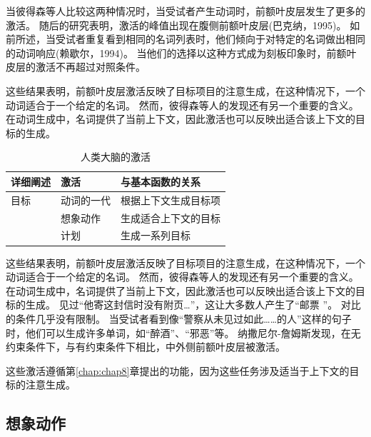 当彼得森等人比较这两种情况时，当受试者产生动词时，前额叶皮层发生了更多的激活。
随后的研究表明，激活的峰值出现在腹侧前额叶皮层(巴克纳，1995)。
如前所述，当受试者重复看到相同的名词列表时，他们倾向于对特定的名词做出相同的动词响应(赖歇尔，1994)。
当他们的选择以这种方式成为刻板印象时，前额叶皮层的激活不再超过对照条件。
\par


这些结果表明，前额叶皮层激活反映了目标项目的注意生成，在这种情况下，一个动词适合于一个给定的名词。
然而，彼得森等人的发现还有另一个重要的含义。
在动词生成中，名词提供了当前上下文，因此激活也可以反映出适合该上下文的目标的生成。
\par


\begin{table}[htbp] 
	\newcommand{\tabincell}[2]{\begin{tabular}{@{}#1@{}}#2\end{tabular}} %
	\centering
	\caption{人类大脑的激活\label{tab:9_2}}
	\renewcommand\arraystretch{1.5}	%
	\begin{tabular}{lll}
		\toprule
		详细阐述 & 激活 & 与基本函数的关系\\
		\midrule
		目标 & 动词的一代 & 根据上下文生成目标项  \\
		& 想象动作 & 生成适合上下文的目标 \\
		&  计划 & 生成一系列目标 \\
		\bottomrule
		
	\end{tabular}%
\end{table}%


这些结果表明，前额叶皮层激活反映了目标项目的注意生成，在这种情况下，一个动词适合于一个给定的名词。
然而，彼得森等人的发现还有另一个重要的含义。
在动词生成中，名词提供了当前上下文，因此激活也可以反映出适合该上下文的目标的生成。
见过“他寄这封信时没有附页…”，这让大多数人产生了“邮票 ”。
对比的条件几乎没有限制。
当受试者看到像“警察从未见过如此……的人”这样的句子时，他们可以生成许多单词，如“醉酒”、“邪恶”等。
纳撒尼尔-詹姆斯发现，在无约束条件下，与有约束条件下相比，中外侧前额叶皮层被激活。
\par


这些激活遵循第\ref{chap:chap8}章提出的功能，因为这些任务涉及适当于上下文的目标的注意生成。



\subsection{想象动作}

